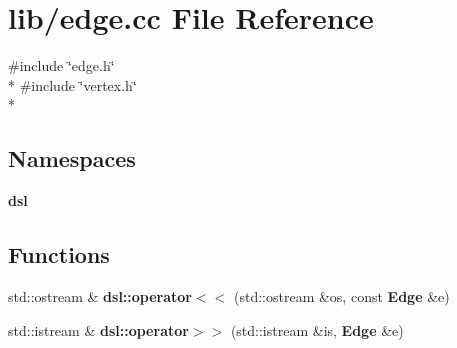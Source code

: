 \section{lib/edge.cc File Reference}
\label{lib_2edge_8cc}
{\ttfamily \#include \char`\"{}edge.\-h\char`\"{}}\\*
{\ttfamily \#include \char`\"{}vertex.\-h\char`\"{}}\\*
\subsection*{Namespaces}
\begin{DoxyCompactItemize}
\item 
{\bf dsl}
\end{DoxyCompactItemize}
\subsection*{Functions}
\begin{DoxyCompactItemize}
\item 
std\-::ostream \& {\bf dsl\-::operator$<$$<$} (std\-::ostream \&os, const {\bf Edge} \&e)
\item 
std\-::istream \& {\bf dsl\-::operator$>$$>$} (std\-::istream \&is, {\bf Edge} \&e)
\end{DoxyCompactItemize}
